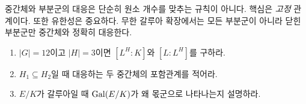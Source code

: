 \begin{pitfall}
중간체와 부분군의 대응은 단순히 원소 개수를 맞추는 규칙이 아니다. 핵심은 \emph{고정} 관계이다. 또한 유한성은 중요하다. 무한 갈루아 확장에서는 모든 부분군이 아니라 닫힌 부분군만 중간체와 정확히 대응한다.
\end{pitfall}

\begin{checkpoint}
\begin{enumerate}[label=(\alph*)]
  \item $|G|=12$이고 $|H|=3$이면 $[L^H:K]$와 $[L:L^H]$를 구하라.
  \item $H_1\subseteq H_2$일 때 대응하는 두 중간체의 포함관계를 적어라.
  \item $E/K$가 갈루아일 때 $\operatorname{Gal}(E/K)$가 왜 몫군으로 나타나는지 설명하라.
\end{enumerate}
\end{checkpoint}
